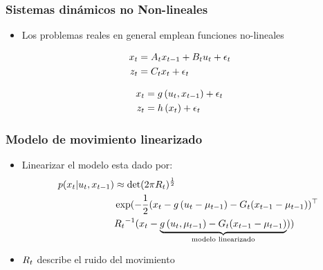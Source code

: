 \begin{frame}
	\frametitle{Sistemas dinámicos no Non-lineales}
	\begin{itemize}
		\item Los problemas reales en general emplean funciones no-lineales
	\end{itemize}
	
	\begin{align*}
		x_{t} &= A_{t} x_{t-1} + B_{t}u_{t} + \epsilon_{t}\\
		z_{t} &= C_{t} x_{t} + \epsilon_{t}
	\end{align*}


	\begin{align*}
		x_{t} &= g\left( u_{t}, x_{t-1} \right) + \epsilon_{t}\\
		z_{t} &= h\left( x_{t} \right) + \epsilon_{t}
	\end{align*}

\end{frame}

\begin{frame}
	\frametitle{Modelo de movimiento linearizado}
	
	\begin{itemize}
		\item Linearizar el modelo esta dado por:
	\begin{align*}
		p(x_{t} | u_{t}, x_{t-1}) &\approx \det(2 \pi R_{t})^{\frac{1}{2}}\\
		&\exp (-\dfrac{1}{2} (x_{t} - g\left( u_{t}-\mu_{t-1} \right) - G_{t}(x_{t-1}-\mu_{t-1}))^{\top}\\
		&{R_{t}}^{-1} (x_{t} - \underbrace{g\left( u_{t},\mu_{t-1} \right) - G_{t} (x_{t-1}-\mu_{t-1})}_{\text{modelo linearizado}}))
	\end{align*}
	
	\item $R_{t}$ describe el ruido del movimiento
	\end{itemize}	
\end{frame}

